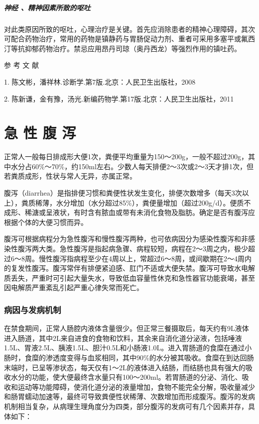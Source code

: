 \paragraph{神经 、精神因素所致的呕吐}

对此类原因所致的呕吐，心理治疗是关键。首先应消除患者的精神心理障碍，其次可配合药物治疗，常用的药物是镇静药与胃肠促动力剂、重者可采用多塞平或氟西汀等抗抑郁药物治疗。禁忌应用昂丹司琼（奥丹西龙）等强烈作用的镇吐药。

\protect\hypertarget{text00029.html}{}{}

\hypertarget{text00029.htmlux5cux23CHP1-11-4}{}
参 考 文 献

1. 陈文彬，潘祥林.诊断学.第7版.北京：人民卫生出版社，2008

2. 陈新谦，金有豫，汤光.新编药物学.第17版.北京：人民卫生出版社，2011

\protect\hypertarget{text00030.html}{}{}

\chapter{急 性 腹 泻}

正常人一般每日排成形大便1次，粪便平均重量为150～200g，一般不超过200g，其中水分占60\%～70\%，约150ml左右。少数人每天排便2～3次或2～3天才排1次，但若粪质成形，性状与常人无异，亦属正常。

腹泻（diarrhea）是指排便习惯和粪便性状发生变化，排便次数增多（每天3次以上），粪质稀薄，水分增加（水分超过85\%），粪便量增加（超过200g/d）。便质不成形、稀溏或呈液状，有时含有脓血或带有未消化食物及脂肪。确定是否有腹泻应根据个体的大便习惯而异。

腹泻可根据病程分为急性腹泻和慢性腹泻两种，也可依病因分为感染性腹泻和非感染性腹泻两大类。急性腹泻是指起病急骤、病程较短，病程在2～3周之内，极少超过6～8周。慢性腹泻指病程至少在4周以上，常超过6～8周，或间歇期在2～4周内的复发性腹泻。腹泻常伴有排便紧迫感、肛门不适或大便失禁。腹泻可导致水电解质丢失，严重时可引起大量失水，导致低血容量性休克和急性器官功能衰竭，甚至因电解质严重紊乱引起严重心律失常而死亡。

\subsection{病因与发病机制}

在禁食期间，正常人肠腔内液体含量很少。但正常三餐摄取后，每天约有9L液体进入肠道，其中2L来自进食的食物和饮料，其余来自消化道分泌液，包括唾液1.5L、胃液2.5L、胰液1.5L、胆汁0.5L和小肠液1.0L。进入胃肠道的食糜在通过小肠时，食糜的渗透度变得与血浆相同，其中90\%的水分被其吸收。食糜在到达回肠末端时，已呈等渗状态，每天仅有1～2L的液体进入结肠，而结肠也具有强大的吸收水分的功能，使大便最终含水量只有100～200ml。若胃肠道的分泌、消化、吸收和运动等功能障碍，使消化道分泌的液量增加，食物不能完全分解，吸收量减少和肠胃蠕动加速等，最终可导致粪便性状稀薄、次数增加而形成腹泻。腹泻的发病机制相当复杂，从病理生理角度分为四类，部分腹泻的发病可有几个因素并存，具体如下：

